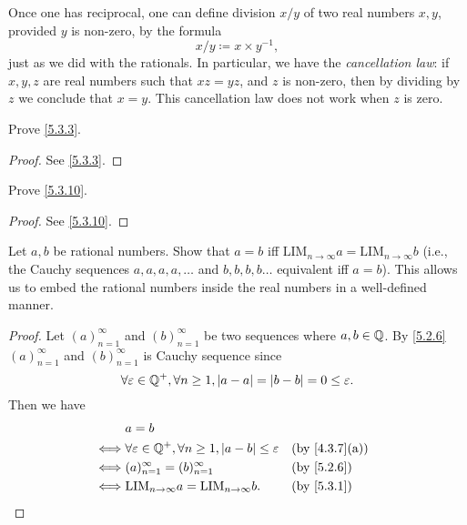 \begin{note}
  Once one has reciprocal, one can define division \(x / y\) of two real numbers \(x, y\), provided \(y\) is non-zero, by the formula
  \[
    x / y \coloneqq x \times y^{-1},
  \]
  just as we did with the rationals.
  In particular, we have the \emph{cancellation law}:
  if \(x, y, z\) are real numbers such that \(xz = yz\), and \(z\) is non-zero, then by dividing by \(z\) we conclude that \(x = y\).
  This cancellation law does not work when \(z\) is zero.
\end{note}

\exercisesection

\begin{ex}\label{ex:5.3.1}
  Prove \cref{5.3.3}.
\end{ex}

\begin{proof}
  See \cref{5.3.3}.
\end{proof}

\begin{ex}\label{ex:5.3.2}
  Prove \cref{5.3.10}.
\end{ex}

\begin{proof}
  See \cref{5.3.10}.
\end{proof}

\begin{ex}\label{ex:5.3.3}
  Let \(a, b\) be rational numbers.
  Show that \(a = b\) iff \(\text{LIM}_{n \to \infty} a = \text{LIM}_{n \to \infty} b\) (i.e., the Cauchy sequences \(a, a, a, a, \dots\) and \(b, b, b, b \dots\) equivalent iff \(a = b\)).
  This allows us to embed the rational numbers inside the real numbers in a well-defined manner.
\end{ex}

\begin{proof}
  Let \((a)_{n = 1}^{\infty}\) and \((b)_{n = 1}^{\infty}\) be two sequences where \(a, b \in \mathbb{Q}\).
  By \cref{5.2.6} \((a)_{n = 1}^\infty\) and \((b)_{n = 1}^\infty\) is Cauchy sequence since
  \[
    \forall \varepsilon \in \mathbb{Q}^+, \forall n \geq 1, \left\lvert a - a\right\rvert = \left\lvert b - b\right\rvert = 0 \leq \varepsilon.
  \]
  Then we have
  \begin{align*}
         & a = b                                                                                                         \\
    \iff & \forall \varepsilon \in \Q^+, \forall n \geq 1, \abs{a - b} \leq \varepsilon &  & \text{(by \cref{4.3.7}(a))} \\
    \iff & (a)_{n = 1}^\infty = (b)_{n = 1}^\infty                                      &  & \by{5.2.6}                  \\
    \iff & \text{LIM}_{n \to \infty} a = \text{LIM}_{n \to \infty} b.                   &  & \by{5.3.1}
  \end{align*}
\end{proof}

